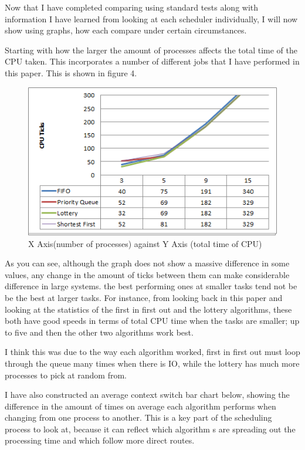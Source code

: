 \documentclass{sig-alternate}
\begin{document}
Now that I have completed comparing using standard tests along with information
I have learned from looking at each scheduler individually, I will now show using
graphs, how each compare under certain circumstances. 

Starting with how the larger the amount of processes affects the total time of
the CPU taken. This incorporates a number of different jobs that I have
performed in this paper. This is shown in figure 4.

\begin{figure}[!h]
\centering
\includegraphics[scale=0.6]{images/compare1.png}
\caption{X Axis(number of processes) against Y Axis (total time of CPU)}
\end{figure}

As you can see, although the graph does not show a massive difference in some
values, any change in the amount of ticks between them can make considerable
difference in large systems. the best performing ones at smaller tasks tend not
be be the best at larger tasks. For instance, from looking back in this paper
and looking at the statistics of the first in first out and the lottery
algorithms, these both have good speeds in terms of total CPU time when the
tasks are smaller; up to five and then the other two algorithms work best. 

I think this was due to the way each algorithm worked, first in first out must
loop through the queue many times when there is IO, while the lottery has much
more processes to pick at random from.

\vspace{3mm}
I have also constructed an average context switch bar chart below, showing the
difference in the amount of times on average each algorithm performs when
changing from one process to another. This is a key part of the scheduling
process to look at, because it can reflect which algorithm s are spreading out
the processing time and which follow more direct routes.
\end{document}
